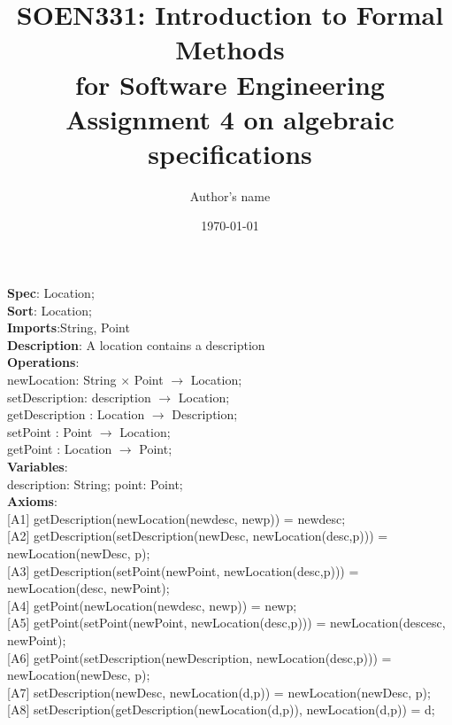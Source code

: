 \documentclass[12pt]{article}
\title{SOEN331: Introduction to Formal Methods\\for Software Engineering\\
Assignment 4 on algebraic specifications}
\author{Author's name}
\date{\today}
\begin{document}
\begin{spacing}{1.5}

\maketitle

\noindent \textbf{Spec}: Location;\\
\noindent \textbf{Sort}: Location;\\
\noindent \textbf{Imports}:String, Point\\
\noindent \textbf{Description}: A location contains a description \\
\noindent \textbf{Operations}:\\
\hspace*{5mm} newLocation: String $\times$ Point $\rightarrow$ Location;\\
\hspace*{5mm} setDescription: description $\rightarrow$ Location;\\
\hspace*{5mm} getDescription : Location $\rightarrow$ Description;\\
\hspace*{5mm} setPoint : Point $\rightarrow$ Location;\\
\hspace*{5mm} getPoint : Location $\rightarrow$ Point;\\
\noindent \textbf{Variables}:\\
\hspace*{5mm} description: String; point: Point;\\
\noindent \textbf{Axioms}:\\
\hspace*{5mm} [A1] getDescription(newLocation(newdesc, newp)) = newdesc;\\
\hspace*{5mm} [A2] getDescription(setDescription(newDesc, newLocation(desc,p))) = newLocation(newDesc, p);\\
\hspace*{5mm} [A3] getDescription(setPoint(newPoint, newLocation(desc,p))) = newLocation(desc, newPoint);\\
\hspace*{5mm} [A4] getPoint(newLocation(newdesc, newp)) = newp;\\
\hspace*{5mm} [A5] getPoint(setPoint(newPoint, newLocation(desc,p))) = newLocation(descesc, newPoint);\\
\hspace*{5mm} [A6] getPoint(setDescription(newDescription, newLocation(desc,p))) = newLocation(newDesc, p);\\
\hspace*{5mm} [A7] setDescription(newDesc, newLocation(d,p)) = newLocation(newDesc, p);\\
\hspace*{5mm} [A8] setDescription(getDescription(newLocation(d,p)), newLocation(d,p)) = d;\\




\end{spacing}
\end{document}
